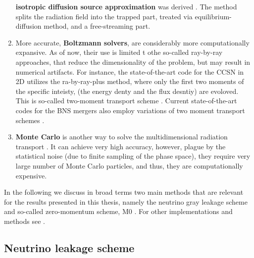 \begin{enumerate}
    \textbf{isotropic diffusion source approximation} was derived \citep{Liebendorfer et al. (2009)}. 
    The method splits the radiation field into the trapped part, treated via equilibrium-diffusion method, and 
    a free-streaming part.
    \item More accurate, \textbf{Boltzmann solvers}, are considerably more computationally expansive. 
    As of now, their use is limited t othe so-called ray-by-ray approaches, that reduce the dimensionality 
    of the problem, but may result in numerical artifacts. 
    For instance, the state-of-the-art code for the \ac{CCSN} in 2D utilizes the ra-by-ray-plus method, where 
    only the first two moments of the specific inteisty, (the energy denty and the flux desntiy) are evoloved.
    This is so-called two-moment transport scheme \citep{Muller et al., 2010}.
    Current state-of-the-art codes for the \ac{BNS} mergers also employ variations of two moment transport schemes 
    \cite[\eg][]{Sekiguchi:2015dma}.
    \item \textbf{Monte Carlo} is another way to solve the multidimensional radiation transport 
    \citep{Fleck:1971,Gentile:2009,Abdikamalov:2012zi}. 
    It can achieve very high accuracy, however, plague by the statistical noise 
    (due to finite sampling of the phase space), they require very large number of Monte Carlo particles, 
    and thus, they are computationally expensive. 
\end{enumerate}

In the following we discuss in broad terms two main methods that are relevant for the results
presented in this thesis, namely the neutrino gray leakage scheme \cite{Galeazzi:2013mia} 
and so-called zero-momentum scheme, M0 \cite{Radice:2016dwd,Radice:2018pdn}.
%
For other implementations and methods see
\cite{vanRiper:1981mko,Ruffert:1995fs,Rosswog:2003rv,OConnor:2009iuz,Sekiguchi:2010ep,Neilsen:2014hha,Perego:2015agy,Ardevol-Pulpillo:2018btx}.



\subsection{Neutrino leakage scheme}


